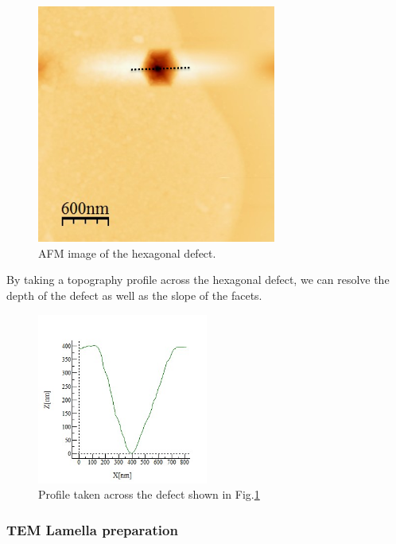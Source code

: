 \begin{figure}[!ht]
	\centering
	\includegraphics[width=0.7\textwidth]{Figs/Ch3/AFM.png}
	\caption[h] {AFM image of the hexagonal defect.}
	\label{afm-pit}
\end{figure}
\FloatBarrier 

By taking a topography profile across the hexagonal defect, we can resolve the depth of the defect as well as the slope of the facets.

\begin{figure}[!ht]
	\centering
	\includegraphics[width=0.5\textwidth]{Figs/Ch3/profile}
	\caption[h] {Profile taken across the defect shown in Fig.\ref{afm-pit}}
	\label{profile}
\end{figure}
\FloatBarrier 

\subsubsection{TEM Lamella preparation}
\label{FIB marker section}

